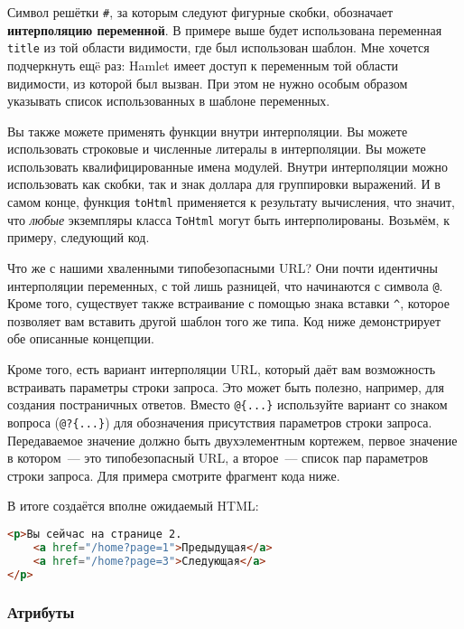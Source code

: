 Символ решётки \lstinline'#', за которым следуют фигурные скобки, обозначает
\textbf{интерполяцию переменной}. В примере выше будет использована переменная
\lstinline!title! из той области видимости, где был использован шаблон. Мне
хочется подчеркнуть ещë раз: Hamlet имеет доступ к переменным той
области видимости, из которой был вызван.  При этом не нужно особым образом
указывать список использованных в шаблоне переменных.

Вы также можете применять функции внутри интерполяции. Вы можете использовать
строковые и численные литералы в интерполяции. Вы можете использовать
квалифицированные имена модулей.  Внутри интерполяции можно использовать как
скобки, так и знак доллара для группировки выражений. И в самом конце, функция
\lstinline!toHtml! применяется к результату вычисления, что значит, что
\emph{любые} экземпляры класса \lstinline!ToHtml! могут быть интерполированы.
Возьмём, к примеру, следующий код.


Что же с нашими хваленными типобезопасными URL? Они почти идентичны
интерполяции переменных, с той лишь разницей, что начинаются с символа
\lstinline'@'. Кроме того, существует также встраивание с помощью знака вставки
\lstinline'^', которое позволяет вам вставить другой шаблон того же типа.  Код
ниже демонстрирует обе описанные концепции.


Кроме того, есть вариант интерполяции URL, который даёт вам возможность
встраивать параметры строки запроса. Это может быть полезно, например, для
создания постраничных ответов. Вместо \lstinline'@{...}' используйте вариант со
знаком вопроса (\lstinline'@?{...}') для обозначения присутствия параметров
строки запроса. Передаваемое значение должно быть двухэлементным кортежем,
первое значение в котором~--- это типобезопасный URL, а второе~--- список пар
параметров строки запроса. Для примера смотрите фрагмент кода ниже.


В итоге создаётся вполне ожидаемый HTML:
\begin{lstlisting}[language=HTML]
<p>Вы сейчас на странице 2.
    <a href="/home?page=1">Предыдущая</a>
    <a href="/home?page=3">Следующая</a>
</p>
\end{lstlisting}

\subsubsection{Атрибуты}

